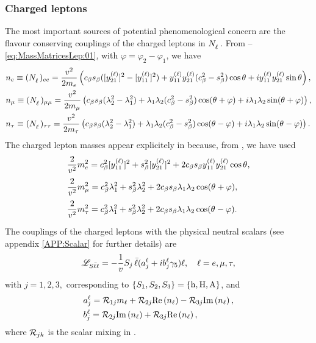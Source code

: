 \documentclass[12pt,a4paper]{article}
\begin{document}
\subsubsection{Charged leptons\label{ssSEC:ChLeptons}}
The most important sources of potential phenomenological concern are the flavour conserving couplings of the charged leptons in $\mNL$. From --\eqref{eq:MassMatricesLep:01}, with $\varphi=\varphi_2-\varphi_1$, we have
\begin{equation}\label{eq:Nl:diag:00}
 \begin{aligned}
  &n_e \equiv (\mNL)_{ee}=\frac{\vev{}^2}{2m_e}\left(\Cb\Sb([\yL{21}]^2-[\yL{11}]^2)+\yL{11}\yL{21}(\Cb^2-\Sb^2)\cos\vevPh{}+i\yL{11}\yL{21}\sin\vevPh{}\right),\\
  &n_\mu \equiv (\mNL)_{\mu\mu}=\frac{\vev{}^2}{2m_\mu}\left(\Cb\Sb(\lambda_2^2-\lambda_1^2)+\lambda_{1}\lambda_{2}(\Cb^2-\Sb^2)\cos(\vevPh{}+\varphi)+i\lambda_{1}\lambda_{2}\sin(\vevPh{}+\varphi)\right), \\
  &n_\tau \equiv (\mNL)_{\tau\tau}=\frac{\vev{}^2}{2m_\tau} \left(\Cb\Sb(\lambda_2^2-\lambda_1^2)+\lambda_{1}\lambda_{2}(\Cb^2-\Sb^2)\cos(\vevPh{}-\varphi)+i\lambda_{1}\lambda_{2}\sin(\vevPh{}-\varphi)\right).
 \end{aligned}
\end{equation}
The charged lepton masses appear explicitely in  because, from , we have used
\begin{equation}\label{eq:Ml:diag:00}
 \begin{aligned}
  & \frac{2}{v_{}^2}m_e^2=c_\beta^2[y_{11}^{\rm (\ell)}]^2+s_\beta^2[y_{21}^{\rm (\ell)}]^2+2c_\beta s_\beta y_{11}^{\rm (\ell)}y_{21}^{\rm (\ell)}\cos\theta_{},\\
  & \frac{2}{v_{}^2}m_\mu^2=c_\beta^2\lambda_{1}^2+s_\beta^2\lambda_{2}^2+2c_\beta s_\beta\lambda_{1}\lambda_{2}\cos(\theta_{}+\varphi),\\
  & \frac{2}{v_{}^2}m_\tau^2=c_\beta^2\lambda_{1}^2+s_\beta^2\lambda_{2}^2+2c_\beta s_\beta\lambda_{1}\lambda_{2}\cos(\theta_{}-\varphi).
 \end{aligned}
\end{equation}
The couplings of the charged leptons with the physical neutral scalars (see appendix \ref{APP:Scalar} for further details) are
\begin{equation}\label{eq:Sll:couplings:00}
 \mathscr L_{S\bar{\ell}\ell}=-\frac{1}{v_{}}S_j\,\bar \ell(a_j^\ell+ib_j^\ell\gamma_5)\ell,\quad \ell=e,\mu,\tau,
\end{equation}
with $j=1,2,3,$ corresponding to $\{S_1,S_2,S_3\}=\{{\rm h},{\rm H},{\rm A}\}$, and
\begin{equation}\label{eq:Sll:couplings:01}
 \begin{aligned}
& a_j^\ell=\mathcal R_{1j}m_\ell+\mathcal R_{2j}\text{Re}\left(n_\ell\right)-\mathcal R_{3j}\text{Im}\left(n_\ell\right),\\
& b_j^\ell=\mathcal R_{2j}\text{Im}\left(n_\ell\right)+\mathcal R_{3j}\text{Re}\left(n_\ell\right),
 \end{aligned}
\end{equation}
where $\mathcal R_{jk}$ is the scalar mixing in .
\end{document}
